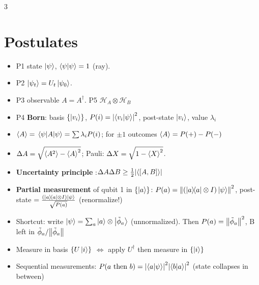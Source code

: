 \documentclass[10pt]{article}
\newcommand{\trap}{\textcolor{red!70!black}}   %
\begin{document}
\begin{multicols*}{3}
\section{Postulates}
\begin{itemize}
  \item P1 state $\ket\psi$, $\braket\psi=1$ (ray). 
  \item  P2 $\ket{\psi_t}=U_t\ket{\psi_0}$. 
  \item P3 observable $A=A^\dagger$. P5 $\mathcal H_A\otimes\mathcal H_B$
  \item P4 \textbf{Born}: basis $\{\ket{v_i}\}$, $P(i)=\abs{\braket{v_i}{\psi}}^2$, post-state $\ket{v_i}$, value $\lambda_i$
  \item $\ev{A}=\mel{\psi}{A}{\psi}=\sum\lambda_iP(i)$; for $\pm1$ outcomes $\ev{A}=P(+)-P(-)$
  \item $\Delta A=\sqrt{\ev{A^2}-\ev{A}^2}$; Pauli: $\Delta X=\sqrt{1-\ev X^2}$. 
  \item \textbf{Uncertainty principle} :$\Delta A\Delta B\ge\tfrac12\abs{\ev{[A,B]}}$
  \item \textbf{Partial measurement} of qubit 1 in $\{\ket{a}\}$: $P(a)=\norm{(\dyad a\otimes I)\ket\psi}^2$, post-state $=\tfrac{(\dyad a\otimes I)\ket\psi}{\sqrt{P(a)}}$ \trap{(renormalize!)}
  \item Shortcut: write $\ket\psi=\sum_a\ket a\otimes\ket{\tilde\phi_a}$ (unnormalized). Then $P(a)=\norm{\tilde\phi_a}^2$, B left in $\tilde\phi_a/\norm{\tilde\phi_a}$
  \item Measure in basis $\{U\ket{i}\}$ $\Leftrightarrow$ apply $U^\dagger$ then measure in $\{\ket i\}$
  \item Sequential measurements: $P(a\text{ then }b)=\abs{\braket{a}{\psi}}^2\abs{\braket{b}{a}}^2$ (state collapses in between)
\end{itemize}

\end{multicols*}
\end{document}
